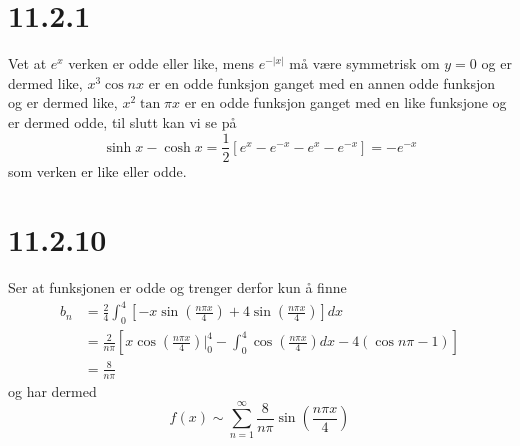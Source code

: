 \documentclass{report}
\newcommand{\nbrack}[1]{\left( #1 \right)}
\newcommand{\bbrack}[1]{\left[ #1 \right]}
\begin{document}
\section*{11.2.1}
Vet at $e^{x}$ verken er odde eller like, mens $e^{-|x|}$ må være symmetrisk om $y=0$ og er dermed like, $x^{3}\cos nx$ er en odde funksjon ganget med en annen odde funksjon og er dermed like, $x^{2}\tan \pi x$ er en odde funksjon ganget med en like funksjone og er dermed odde, til slutt kan vi se på
\begin{equation}
  \label{eq:12}
  \sinh x - \cosh x = \frac{1}{2} \bbrack{ e^{x} - e^{-x} - e^{x} - e^{-x} } = -e^{-x}
\end{equation}
som verken er like eller odde.


\section*{11.2.10}
Ser at funksjonen er odde og trenger derfor kun å finne
\begin{equation}
  \label{eq:14}
  \begin{split}
    b_{n} &= \frac{2}{4} \int_{0}^{4} \bbrack{ -x \sin \nbrack{ \frac{n\pi x}{4} } + 4\sin \nbrack{ \frac{n\pi x}{4} } } dx \\
          &= \frac{2}{n\pi} \bbrack{ x\cos \nbrack{ \frac{n\pi x}{4} } \Big|_{0}^{4} - \int_{0}^{4} \cos \nbrack{ \frac{n\pi x}{4} }dx - 4 \nbrack{ \cos n\pi - 1 } } \\
    &= \frac{8}{n\pi}
  \end{split}
\end{equation}
og har dermed
\begin{equation}
  \label{eq:15}
  f(x) \sim \sum_{n=1}^{\infty} \frac{8}{n\pi} \sin \nbrack{ \frac{n\pi x}{4} }
\end{equation}
\end{document}
